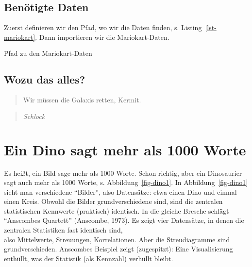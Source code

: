 \documentclass[
  letterpaper,
]{scrbook}
\newenvironment{Shaded}{\begin{snugshade}}{\end{snugshade}}
\newcommand{\FunctionTok}[1]{\textcolor[rgb]{0.28,0.35,0.67}{#1}}
\newcommand{\NormalTok}[1]{\textcolor[rgb]{0.00,0.23,0.31}{#1}}
\newcommand{\OtherTok}[1]{\textcolor[rgb]{0.00,0.23,0.31}{#1}}
\newcommand{\StringTok}[1]{\textcolor[rgb]{0.13,0.47,0.30}{#1}}
\theoremstyle{definition}
\theoremstyle{definition}
\theoremstyle{definition}
\theoremstyle{remark}
\begin{document}
\subsection{Benötigte Daten}\label{benuxf6tigte-daten-2}

Zuerst definieren wir den Pfad, wo wir die Daten finden, s.
Listing~\ref{lst-mariokart}. Dann importieren wir die Mariokart-Daten.

\begin{codelisting}

\caption{\label{lst-mariokart}Pfad zu den Mariokart-Daten}

\centering{

\begin{Shaded}
\begin{Highlighting}[]
\NormalTok{mariokart\_path }\OtherTok{\textless{}{-}} \FunctionTok{paste0}\NormalTok{(}
  \StringTok{"https://vincentarelbundock.github.io/Rdatasets"}\NormalTok{,}
  \StringTok{"/csv/openintro/mariokart.csv"}\NormalTok{)}

\NormalTok{mariokart }\OtherTok{\textless{}{-}} \FunctionTok{read.csv}\NormalTok{(mariokart\_path)}
\end{Highlighting}
\end{Shaded}

}

\end{codelisting}%

\subsection{Wozu das alles?}\label{wozu-das-alles}

\begin{quote}
{} Wir müssen die Galaxis retten, Kermit.
\end{quote}

\begin{quote}
{} \emph{Schlock}
\end{quote}

\section{Ein Dino sagt mehr als 1000
Worte}\label{ein-dino-sagt-mehr-als-1000-worte}

Es heißt, ein Bild sage mehr als 1000 Worte. Schon richtig, aber ein
Dinosaurier sagt auch mehr als 1000 Worte, s. Abbildung~\ref{fig-dino1}.
In Abbildung~\ref{fig-dino1} sieht man verschiedene \enquote{Bilder},
also Datensätze: etwa einen Dino und einmal einen Kreis. Obwohl die
Bilder grundverschiedene sind, sind die zentralen statistischen
Kennwerte (praktisch) identisch. In die gleiche Bresche schlägt
\enquote{Anscombes Quartett} (Anscombe, 1973). Es zeigt vier Datensätze,
in denen die zentralen Statistiken fast identisch sind,\\
also Mittelwerte, Streuungen, Korrelationen. Aber die Streudiagramme
sind grundverschieden. Anscombes Beispiel zeigt (zugespitzt): Eine
Visualisierung enthüllt, was der Statistik (als Kennzahl) verhüllt
bleibt.
\end{document}

